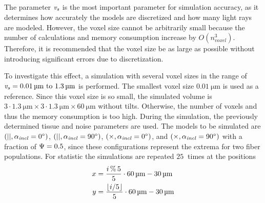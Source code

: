 \subsection{\Voxelsize{} \texorpdfstring{\voxelsize{}}{}}
%
The parameter \Voxelsize{} $\textnormal{$\mathit{v_{s}}$}$ is the most important parameter for simulation accuracy, as it determines how accurately the models are discretized and how many light rays are modeled.
However, the voxel size cannot be arbitrarily small because the number of calculations and memory consumption increase by $O(n_{\mathit{voxel}}^3)$.
Therefore, it is recommended that the voxel size be as large as possible without introducing significant errors due to discretization.
\par
%
To investigate this effect, a simulation with several voxel sizes in the range of $\voxelsize = \SIrange{0.01}{1.3}{\micro\meter}$ is performed.
The smallest voxel size $\SI{0.01}{\micro\meter}$ is used as a reference.
Since this voxel size is so small, the simulated volume is $3 \cdot \SI{1.3}{\micro\meter} \times 3 \cdot \SI{1.3}{\micro\meter} \times \SI{60}{\micro\meter}$ without tilts.
Otherwise, the number of voxels and thus the memory consumption is too high.
During the simulation, the previously determined tissue and noise parameters are used.
The models to be simulated are $(||,\textnormal{$\alpha_{\mathit{incl}}$} = \SI{0}{\degree})$, $(||,\textnormal{$\alpha_{\mathit{incl}}$} = \SI{90}{\degree})$, $(\times, \textnormal{$\alpha_{\mathit{incl}}$} = \SI{0}{\degree})$, and $(\times,\textnormal{$\alpha_{\mathit{incl}}$} = \SI{90}{\degree})$ with a fraction of $\textnormal{$\Psi$} = \SI{0.5}{}$, since these configurations represent the extrema for two fiber populations.
For statistic the simulations are repeated $\SI{25}{}$ times at the positions
\begin{align}
\begin{split}
    x&=\frac{i\,\%\,5}{5} \cdot \SI{60}{\micro\meter} - \SI{30}{\micro\meter} \\
    y&=\frac{\floor{i/5}}{5} \cdot \SI{60}{\micro\meter} - \SI{30}{\micro\meter} 
\end{split}
\end{align}
% 
% 
% 
